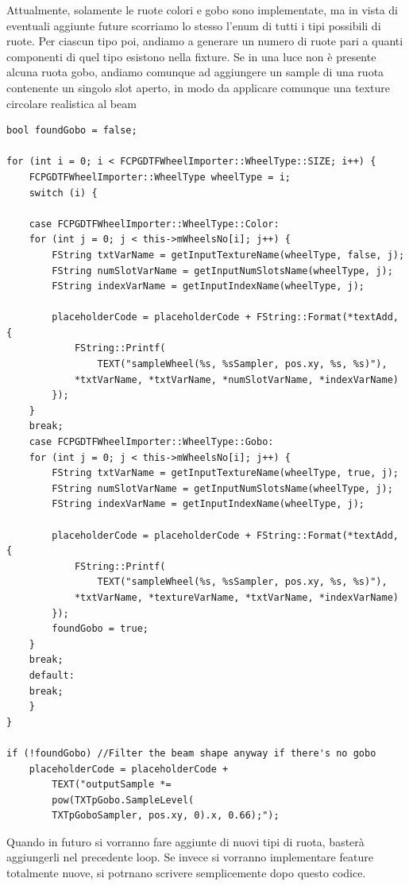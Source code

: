 \documentclass[main.tex]{subfiles}
\begin{document}
Attualmente, solamente le ruote colori e gobo sono implementate, ma in vista di eventuali aggiunte future scorriamo lo stesso l'enum di tutti i tipi possibili di ruote. Per ciascun tipo poi, andiamo a generare un numero di ruote pari a quanti componenti di quel tipo esistono nella fixture. Se in una luce non è presente alcuna ruota gobo, andiamo comunque ad aggiungere un sample di una ruota contenente un singolo slot aperto, in modo da applicare comunque una texture circolare realistica al beam
\begin{lstlisting}
bool foundGobo = false;

for (int i = 0; i < FCPGDTFWheelImporter::WheelType::SIZE; i++) {
    FCPGDTFWheelImporter::WheelType wheelType = i;
    switch (i) {
    
    case FCPGDTFWheelImporter::WheelType::Color:
    for (int j = 0; j < this->mWheelsNo[i]; j++) {
        FString txtVarName = getInputTextureName(wheelType, false, j);
        FString numSlotVarName = getInputNumSlotsName(wheelType, j);
        FString indexVarName = getInputIndexName(wheelType, j);

        placeholderCode = placeholderCode + FString::Format(*textAdd, {
            FString::Printf(
                TEXT("sampleWheel(%s, %sSampler, pos.xy, %s, %s)"),
            *txtVarName, *txtVarName, *numSlotVarName, *indexVarName)
        });
    }
    break;
    case FCPGDTFWheelImporter::WheelType::Gobo:
    for (int j = 0; j < this->mWheelsNo[i]; j++) {
        FString txtVarName = getInputTextureName(wheelType, true, j);
        FString numSlotVarName = getInputNumSlotsName(wheelType, j);
        FString indexVarName = getInputIndexName(wheelType, j);
        
        placeholderCode = placeholderCode + FString::Format(*textAdd, {
            FString::Printf(
                TEXT("sampleWheel(%s, %sSampler, pos.xy, %s, %s)"),
            *txtVarName, *textureVarName, *txtVarName, *indexVarName)
        });
        foundGobo = true;
    }
    break;
    default:
    break;
    }
}

if (!foundGobo) //Filter the beam shape anyway if there's no gobo
    placeholderCode = placeholderCode +
        TEXT("outputSample *=
        pow(TXTpGobo.SampleLevel(
        TXTpGoboSampler, pos.xy, 0).x, 0.66);");

\end{lstlisting}
Quando in futuro si vorranno fare aggiunte di nuovi tipi di ruota, basterà aggiungerli nel precedente loop. Se invece si vorranno implementare feature totalmente nuove, si potrnano scrivere semplicemente dopo questo codice.\newline
\end{document}
